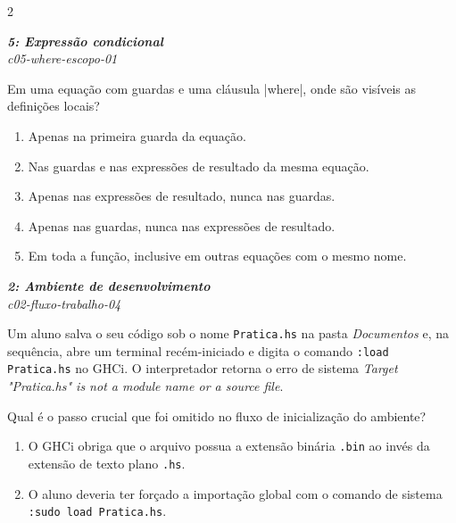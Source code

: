 \documentclass[a4paper,10pt,brazil]{article}
\begin{document}
\begin{multicols}{2}
\begin{flushright}
  \footnotesize
  \textit{\textbf{5: Expressão condicional}}\\
  \textit{c05-where-escopo-01}\\

\end{flushright}
Em uma equação com guardas e uma cláusula \haskellinline|where|, onde são visíveis as definições locais?

\begin{enumerate}
  \item Apenas na primeira guarda da equação.

  \item Nas guardas e nas expressões de resultado da mesma equação.

  \item Apenas nas expressões de resultado, nunca nas guardas.

  \item Apenas nas guardas, nunca nas expressões de resultado.

  \item Em toda a função, inclusive em outras equações com o mesmo nome.


\end{enumerate}

\begin{flushright}
  \footnotesize
  \textit{\textbf{2: Ambiente de desenvolvimento}}\\
  \textit{c02-fluxo-trabalho-04}\\

\end{flushright}
Um aluno salva o seu código sob o nome \texttt{Pratica.hs} na pasta \emph{Documentos} e, na sequência, abre um terminal recém-iniciado e digita o comando \texttt{:load Pratica.hs} no GHCi. O interpretador retorna o erro de sistema \emph{Target "Pratica.hs" is not a module name or a source file}. 

Qual é o passo crucial que foi omitido no fluxo de inicialização do ambiente?

\begin{enumerate}
  \item O GHCi obriga que o arquivo possua a extensão binária \texttt{.bin} ao invés da extensão de texto plano \texttt{.hs}.

  \item O aluno deveria ter forçado a importação global com o comando de sistema \texttt{:sudo load Pratica.hs}.


\end{enumerate}
\end{multicols}
\end{document}
